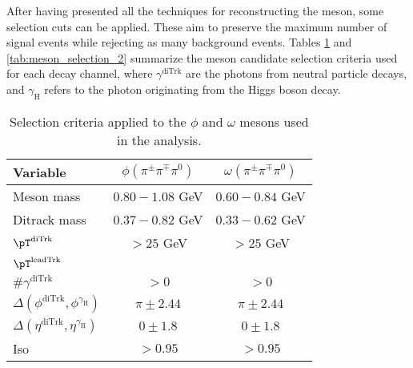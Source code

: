 After having presented all the techniques for reconstructing the meson, some selection cuts can be applied. These aim to preserve the maximum number of signal events while rejecting as many background events. Tables \ref{tab:meson_selection_1} and \ref{tab:meson_selection_2} summarize the meson candidate selection criteria used for each decay channel, where $\gamma^{\text{diTrk}}$ are the photons from neutral particle decays, and $\gamma_\text{H}$ refers to the photon originating from the Higgs boson decay.
\begin{table}[!ht]
    \centering
    \begin{tabular}{|l|c|c|}
        \hline
        \cellcolor{lightgray}Variable & \cellcolor{lightgray}$\phi(\pi^{\pm}\pi^{\mp}\pi^{0})$ & \cellcolor{lightgray}$\omega(\pi^{\pm}\pi^{\mp}\pi^{0})$ \\ \hline
        Meson mass                                              &$0.80-1.08$ GeV  &$0.60-0.84$ GeV    \\
        Ditrack mass                                            &$0.37-0.82$ GeV  &$0.33-0.62$ GeV      \\
        $\pT^{\text{diTrk}}$                                    &$>25$ GeV        &$>25$ GeV              \\
        $\pT^{\text{leadTrk}}$                                  &         &               \\
        $\#\gamma^{\text{diTrk}}$                               &$>0$             &$>0$                   \\
        $\Delta(\phi^{\text{diTrk}}, \phi^{\gamma_\text{H}})$   &$\pi\pm2.44$     &$\pi\pm2.44$        \\
        $\Delta(\eta^{\text{diTrk}}, \eta^{\gamma_\text{H}})$   &$0\pm1.8$        &$0\pm1.8$              \\
        Iso                                                     &$>0.95$          &$>0.95$                \\
        \hline
        \end{tabular}
    \caption{Selection criteria applied to the $\phi$ and $\omega$ mesons used in the analysis.}
    \label{tab:meson_selection_1}
\end{table}

